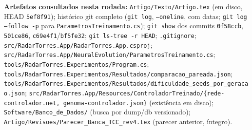\documentclass[11pt,a4paper]{article}
\begin{document}
\textbf{Artefatos consultados nesta rodada:} \texttt{Artigo/Texto/Artigo.tex} (em disco, HEAD
\texttt{5ef8f91}); histórico git completo (\texttt{git log}, \texttt{--oneline}, com datas;
\texttt{git log --follow -p} para \texttt{ParametrosTreinamento.cs}); \texttt{git show} dos commits
\texttt{0f58ccb}, \texttt{501ce86}, \texttt{c69e4f1}/\texttt{bf5fe32}; \texttt{git ls-tree -r HEAD};
\texttt{.gitignore}; \texttt{src/RadarTorres.App/RadarTorres.App.csproj};
\texttt{src/RadarTorres.App/NeuralEvolution/ParametrosTreinamento.cs};
\texttt{tools/RadarTorres.Experimentos/Program.cs};
\texttt{tools/RadarTorres.Experimentos/Resultados/comparacao\_pareada.json};
\texttt{tools/RadarTorres.Experimentos/Resultados/dificuldade\_seeds\_por\_geracao.json};
\texttt{src/RadarTorres.App/Resources/ControladorTreinado/\{rede-controlador.net,
genoma-controlador.json\}} (existência em disco); \texttt{Software/Banco\_de\_Dados/} (busca por
dump/db versionado); \texttt{Artigo/Revisoes/Parecer\_Banca\_TCC\_rev4.tex} (parecer anterior, íntegro).
\end{document}
